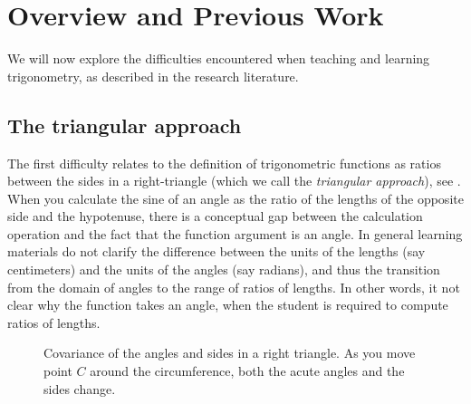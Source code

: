 
\chapter{Overview and Previous Work}

We will now explore the difficulties encountered when teaching and learning trigonometry, as described in the research literature.

\section{The triangular approach}

The first difficulty relates to the definition of trigonometric functions as ratios between the sides in a right-triangle (which we call the \textit{triangular approach}), see \cite{thompson}.
When you calculate the sine of an angle as the ratio of the lengths of the opposite side and the hypotenuse, there is a conceptual gap between the calculation operation and the fact that the function argument is an angle.
In general learning materials do not clarify the difference between the units of the lengths (say centimeters) and the units of the angles (say radians), and thus the transition from the domain of angles to the range of ratios of lengths.
In other words, it not clear why the function takes an angle, when the student is required to compute ratios of lengths.

\begin{wrapfigure}{r}{.5\textwidth}
\begin{center}
\vspace{-3em}
\caption{Covariance of the angles and sides in a right triangle. As you move point $C$ around the circumference, both the acute angles and the sides change.}\label{fig.covariance}
\end{center}
\end{wrapfigure}

